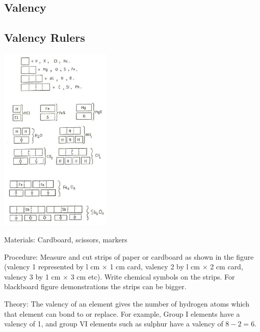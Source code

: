 \begin{multicols}{2}

\section*{Valency}


\subsection{Valency Rulers}

\begin{center}
\includegraphics[width=0.4\textwidth]{./img/source/valency-ruler.jpg}
\end{center}

\begin{description*}
\item[Materials:]{Cardboard, scissors, markers}
\item[Procedure:]{Measure and cut strips of paper or cardboard as shown in the figure (valency 1 represented by
l cm $\times$ 1 cm card, valency 2 by l cm $\times$ 2 cm card,
valency 3 by 1 cm $\times$ 3 cm etc). Write chemical
symbols on the strips. For blackboard figure
demonstrations the strips can be bigger.}
\item[Theory:]{The valency of an element gives the number of
hydrogen atoms which that element can bond to or
replace. For example, Group I elements have a valency of 1, and group VI elements such as sulphur have a valency of $8-2=6$.}
\end{description*}


\end{multicols}

